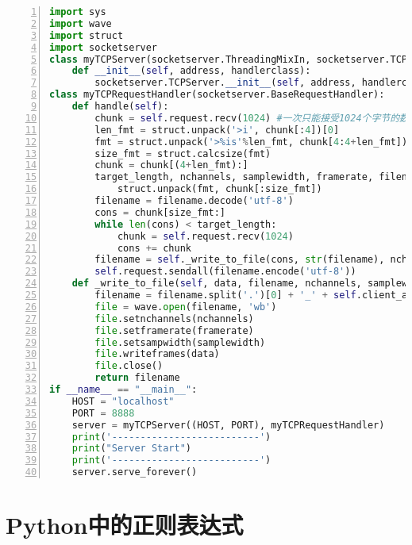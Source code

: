 \begin{lstlisting}[language = python, caption={音频传输的server端代码}, label={lst:sendsave-wave-server}, numbers=left, 
       numberstyle=\tiny,keywordstyle=\color{blue!70},
       commentstyle=\color{red!50!green!50!blue!50},frame=shadowbox,
       rulesepcolor=\color{red!20!green!20!blue!20},basicstyle=\ttfamily]
import sys
import wave
import struct
import socketserver
class myTCPServer(socketserver.ThreadingMixIn, socketserver.TCPServer):
    def __init__(self, address, handlerclass):
        socketserver.TCPServer.__init__(self, address, handlerclass)
class myTCPRequestHandler(socketserver.BaseRequestHandler):
    def handle(self):
        chunk = self.request.recv(1024) #一次只能接受1024个字节的数据，其他的会继续传过来
        len_fmt = struct.unpack('>i', chunk[:4])[0] 
        fmt = struct.unpack('>%is'%len_fmt, chunk[4:4+len_fmt])[0].decode('utf-8') 
        size_fmt = struct.calcsize(fmt)
        chunk = chunk[(4+len_fmt):]
        target_length, nchannels, samplewidth, framerate, filename = \
            struct.unpack(fmt, chunk[:size_fmt])
        filename = filename.decode('utf-8')
        cons = chunk[size_fmt:]
        while len(cons) < target_length:
            chunk = self.request.recv(1024)
            cons += chunk
        filename = self._write_to_file(cons, str(filename), nchannels, samplewidth, framerate)
        self.request.sendall(filename.encode('utf-8'))
    def _write_to_file(self, data, filename, nchannels, samplewidth, framerate):
        filename = filename.split('.')[0] + '_' + self.client_address[0] + '.wav'
        file = wave.open(filename, 'wb')
        file.setnchannels(nchannels)
        file.setframerate(framerate)
        file.setsampwidth(samplewidth)
        file.writeframes(data)
        file.close()
        return filename
if __name__ == "__main__":
    HOST = "localhost"
    PORT = 8888
    server = myTCPServer((HOST, PORT), myTCPRequestHandler)
    print('--------------------------')
    print("Server Start")
    print('--------------------------')
    server.serve_forever()
\end{lstlisting}

\section{Python中的正则表达式}